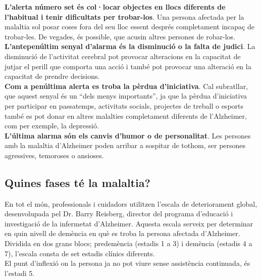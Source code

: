 \documentclass[a4paper,12pt]{article}
\begin{document}
\textbf{L'alerta número set és col·locar objectes en llocs diferents de l'habitual i tenir dificultats per trobar-los}. Una persona afectada per la malaltia sol posar coses fora del seu lloc essent després completament incapaç de trobar-les. De vegades, és possible, que acusin altres persones de robar-los.\\
\textbf{L'antepenúltim senyal d'alarma és la disminució o la falta de judici}. La disminució de l'activitat cerebral pot provocar alteracions en la capacitat de jutjar el perill que comporta una acció i també pot provocar una alteració en la capacitat de prendre decisions.\\
\textbf{Com a penúltima alerta es troba la pèrdua d'iniciativa}. Cal subratllar, que aquest senyal és un “dels menys importants”, ja que la pèrdua d'iniciativa per participar en passatemps, activitats socials, projectes de treball o esports també es pot donar en altres malalties completament diferents de l'Alzheimer, com per exemple, la depressió.\\
\textbf{L'última alarma són els canvis d'humor o de personalitat}. Les persones amb la malaltia d'Alzheimer poden arribar a sospitar de tothom, ser persones agressives, temoroses o ansioses.
\subsection*{Quines fases té la malaltia?}
En tot el món, professionals i cuidadors utilitzen l'escala de deteriorament global, desenvolupada pel Dr. Barry Reisberg, director del programa d'educació i investigació de la infermetat d'Alzheimer. Aquesta escala serveix per determinar en quin nivell de demència en què es troba la persona afectada d'Alzheimer.\\
Dividida en dos grans blocs; predemència (estadis 1 a 3) i demència (estadis 4 a 7), l'escala consta de set estadis clínics diferents.\\
El punt d'inflexió on la persona ja no pot viure sense assistència continuada, és l'estadi 5.
\end{document}

